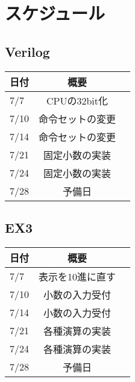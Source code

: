 \documentclass{jsarticle}
\begin{document}
\section*{スケジュール}
\subsection*{Verilog}
\begin{table}[h]
\begin{tabular}{|l|c|c|} \hline
    日付 & 概要 \\ \hline \hline
7/7 & CPUの32bit化 \\ \hline
7/10 & 命令セットの変更 \\ \hline
7/14 & 命令セットの変更 \\ \hline
7/21 & 固定小数の実装 \\ \hline
7/24 & 固定小数の実装 \\ \hline
7/28 & 予備日 \\ \hline
\end{tabular}
\end{table}

\subsection*{EX3}
\begin{table}[h]
\begin{tabular}{|l|c|c|} \hline
    日付 & 概要 \\ \hline \hline
7/7 & 表示を10進に直す \\ \hline
7/10 & 小数の入力受付 \\ \hline
7/14 & 小数の入力受付 \\ \hline
7/21 & 各種演算の実装 \\ \hline
7/24 & 各種演算の実装 \\ \hline
7/28 & 予備日 \\ \hline
\end{tabular}
\end{table}
\end{document}
